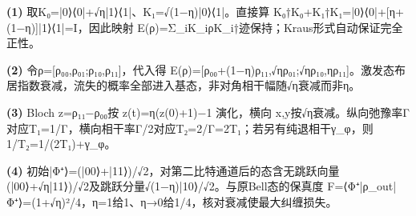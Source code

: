 \par\noindent\textbf{(1)} 取K₀=|0⟩⟨0|+√η|1⟩⟨1|、K₁=√(1−η)|0⟩⟨1|。直接算 K₀†K₀+K₁†K₁=|0⟩⟨0|+[η+(1−η)]|1⟩⟨1|=I，因此映射 E(ρ)=Σ\_iK\_iρK\_i†迹保持；Kraus形式自动保证完全正性。
\par\noindent\textbf{(2)} 令ρ=[ρ₀₀,ρ₀₁;ρ₁₀,ρ₁₁]，代入得 E(ρ)=[ρ₀₀+(1−η)ρ₁₁,√ηρ₀₁;√ηρ₁₀,ηρ₁₁]。激发态布居指数衰减，流失的概率全部进入基态，非对角相干幅随√η衰减而非η。
\par\noindent\textbf{(3)} Bloch z=ρ₁₁−ρ₀₀按 z(t)=η(z(0)+1)−1 演化，横向 x,y按√η衰减。纵向弛豫率Γ对应T₁=1/Γ，横向相干率Γ/2对应T₂=2/Γ=2T₁；若另有纯退相干γ\_φ，则1/T₂=1/(2T₁)+γ\_φ。
\par\noindent\textbf{(4)} 初始|Φ⁺⟩=(|00⟩+|11⟩)/√2，对第二比特通道后的态含无跳跃向量(|00⟩+√η|11⟩)/√2及跳跃分量√(1−η)|10⟩/√2。与原Bell态的保真度 F=⟨Φ⁺|ρ\_out|Φ⁺⟩=(1+√η)²/4，η=1给1、η→0给1/4，核对衰减使最大纠缠损失。
